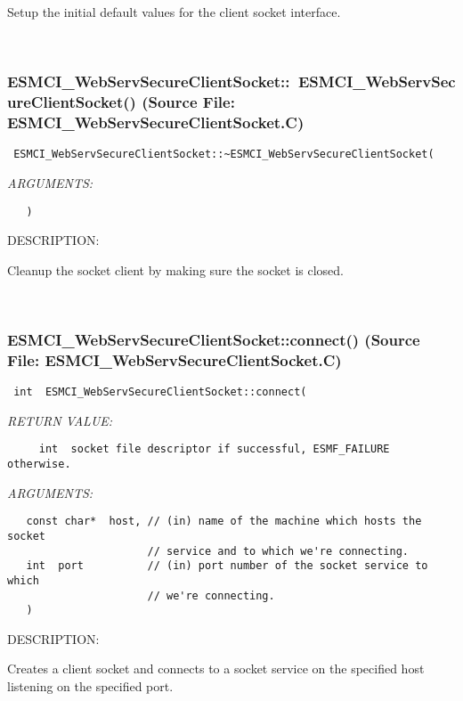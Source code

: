       Setup the initial default values for the client socket interface.
   
 
\mbox{}\hrulefill\
 
\subsubsection{ESMCI\_WebServSecureClientSocket::~ESMCI\_WebServSecureClientSocket() (Source File: ESMCI\_WebServSecureClientSocket.C)}


  
\begin{verbatim} ESMCI_WebServSecureClientSocket::~ESMCI_WebServSecureClientSocket(\end{verbatim}{\em ARGUMENTS:}
\begin{verbatim}   )\end{verbatim}
{\sf DESCRIPTION:\\ }


      Cleanup the socket client by making sure the socket is closed.
   
 
\mbox{}\hrulefill\
 
\subsubsection{ESMCI\_WebServSecureClientSocket::connect() (Source File: ESMCI\_WebServSecureClientSocket.C)}


  
\begin{verbatim} int  ESMCI_WebServSecureClientSocket::connect(\end{verbatim}{\em RETURN VALUE:}
\begin{verbatim}     int  socket file descriptor if successful, ESMF_FAILURE otherwise.\end{verbatim}{\em ARGUMENTS:}
\begin{verbatim}   const char*  host, // (in) name of the machine which hosts the socket
                      // service and to which we're connecting.
   int  port          // (in) port number of the socket service to which
                      // we're connecting.
   )\end{verbatim}
{\sf DESCRIPTION:\\ }


      Creates a client socket and connects to a socket service on the
      specified host listening on the specified port.
  
\setlength{\parskip}{\oldparskip}
\setlength{\parindent}{\oldparindent}
\setlength{\baselineskip}{\oldbaselineskip}
